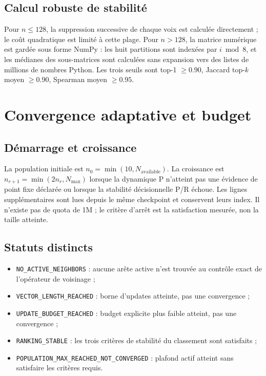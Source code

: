 \documentclass[11pt,a4paper]{report}
\begin{document}
\section{Calcul robuste de stabilité}
Pour $n\leq128$, la suppression successive de chaque voix est calculée directement ; le coût quadratique est limité à cette plage. Pour $n>128$, la matrice numérique est gardée sous forme NumPy : les huit partitions sont indexées par $i\bmod8$, et les médianes des sous-matrices sont calculées sans expansion vers des listes de millions de nombres Python. Les trois seuils sont top-1 $\geq0.90$, Jaccard top-$k$ moyen $\geq0.90$, Spearman moyen $\geq0.95$.

\chapter{Convergence adaptative et budget}
\section{Démarrage et croissance}
La population initiale est $n_0=\min(10,N_{\mathrm{available}})$. La croissance est $n_{r+1}=\min(2n_r,N_{\mathrm{max}})$ lorsque la dynamique P n'atteint pas une évidence de point fixe déclarée ou lorsque la stabilité décisionnelle P/R échoue. Les lignes supplémentaires sont lues depuis le même checkpoint et conservent leurs index. Il n'existe pas de quota de 1M ; le critère d'arrêt est la satisfaction mesurée, non la taille atteinte.

\section{Statuts distincts}
\begin{itemize}[nosep]
\item \texttt{NO\_ACTIVE\_NEIGHBORS} : aucune arête active n'est trouvée au contrôle exact de l'opérateur de voisinage ;
\item \texttt{VECTOR\_LENGTH\_REACHED} : borne d'updates atteinte, pas une convergence ;
\item \texttt{UPDATE\_BUDGET\_REACHED} : budget explicite plus faible atteint, pas une convergence ;
\item \texttt{RANKING\_STABLE} : les trois critères de stabilité du classement sont satisfaits ;
\item \texttt{POPULATION\_MAX\_REACHED\_NOT\_CONVERGED} : plafond actif atteint sans satisfaire les critères requis.
\end{itemize}
\end{document}
